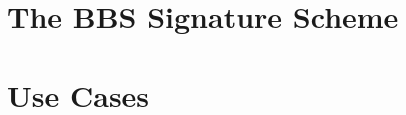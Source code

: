 \documentclass[
	a4paper               %
	,BCOR=0mm            %
	,bibliography=totoc   %
	,listof=totoc         %
	,monolingual
	,twoside=false
]{bfhthesis}              %
\begin{document}










\chapter{The BBS Signature Scheme}
\label{chap:bbs}


\chapter{Use Cases}
\end{document}

